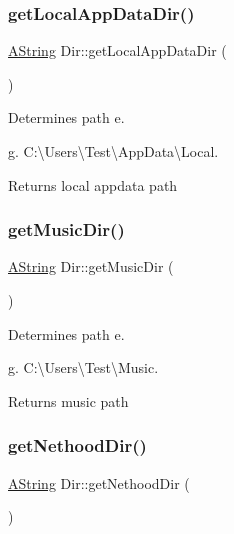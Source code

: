 \subsubsection{\texorpdfstring{getLocalAppDataDir()}{getLocalAppDataDir()}}
{\footnotesize\ttfamily \mbox{\hyperlink{class_a_string}{A\+String}} Dir\+::get\+Local\+App\+Data\+Dir (\begin{DoxyParamCaption}{ }\end{DoxyParamCaption})\hspace{0.3cm}{\ttfamily [static]}}



Determines path e. 

g. C\+:\textbackslash{}\+Users\textbackslash{}\+Test\textbackslash{}\+App\+Data\textbackslash{}\+Local. \begin{DoxyReturn}{Returns}
local appdata path 
\end{DoxyReturn}
\mbox{\label{class_dir_a0459c7e45118cdd686df7ac5637182a8}} 
\subsubsection{\texorpdfstring{getMusicDir()}{getMusicDir()}}
{\footnotesize\ttfamily \mbox{\hyperlink{class_a_string}{A\+String}} Dir\+::get\+Music\+Dir (\begin{DoxyParamCaption}{ }\end{DoxyParamCaption})\hspace{0.3cm}{\ttfamily [static]}}



Determines path e. 

g. C\+:\textbackslash{}\+Users\textbackslash{}\+Test\textbackslash{}\+Music. \begin{DoxyReturn}{Returns}
music path 
\end{DoxyReturn}
\mbox{\label{class_dir_a0579e37d88f7dbe8647251f8a6187075}} 
\subsubsection{\texorpdfstring{getNethoodDir()}{getNethoodDir()}}
{\footnotesize\ttfamily \mbox{\hyperlink{class_a_string}{A\+String}} Dir\+::get\+Nethood\+Dir (\begin{DoxyParamCaption}{ }\end{DoxyParamCaption})\hspace{0.3cm}{\ttfamily [static]}}



